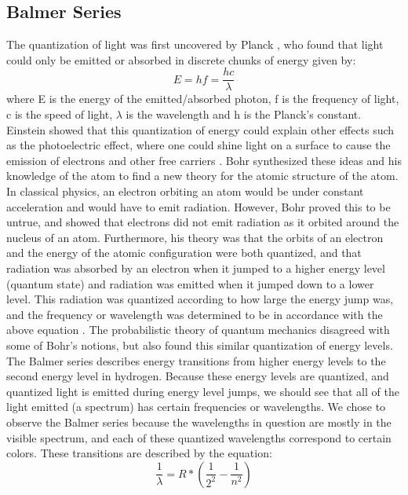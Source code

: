 \documentclass{article}
\begin{document}
    \subsection{Balmer Series}
        The quantization of light was first uncovered by Planck \cite{purd}, who found that light could only be emitted or absorbed in discrete chunks of energy given by:
        \begin{equation}
            E = hf = \frac{hc}{\lambda}
        \end{equation}
        where E is the energy of the emitted/absorbed photon, f is the frequency of light, c is the speed of light, $\lambda$ is the wavelength and h is the Planck's constant. Einstein showed that this quantization of energy could explain other effects such as the photoelectric effect, where one could shine light on a surface to cause the emission of electrons and other free carriers \cite{purd}. Bohr synthesized these ideas and his knowledge of the atom to find a new theory for the atomic structure of the atom. In classical physics, an electron orbiting an atom would be under constant acceleration and would have to emit radiation. However, Bohr proved this to be untrue, and showed that electrons did not emit radiation as it orbited around the nucleus of an atom. Furthermore, his theory was that the orbits of an electron and the energy of the atomic configuration were both quantized, and that radiation was absorbed by an electron when it jumped to a higher energy level (quantum state) and radiation was emitted when it jumped down to a lower level. This radiation was quantized according to how large the energy jump was, and the frequency or wavelength was determined to be in accordance with the above equation \cite{atm}. The probabilistic theory of quantum mechanics disagreed with some of Bohr's notions, but also found this similar quantization of energy levels. The Balmer series describes energy transitions from higher energy levels to the second energy level in hydrogen. Because these energy levels are quantized, and quantized light is emitted during energy level jumps, we should see that all of the light emitted (a spectrum) has certain frequencies or wavelengths. We chose to observe the Balmer series because the wavelengths in question are mostly in the visible spectrum, and each of these quantized wavelengths correspond to certain colors. These transitions are described by the equation:
        \begin{equation}
            \frac{1}{\lambda} = R*(\frac{1}{2^2} - \frac{1}{n^2})
        \end{equation}
\end{document}
